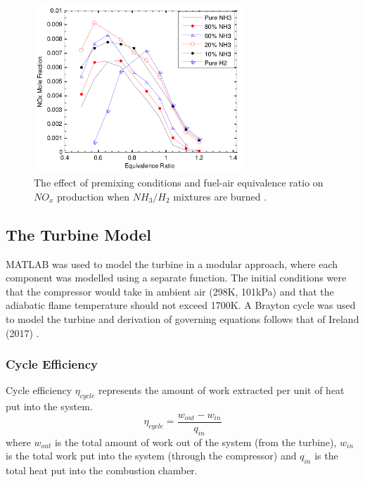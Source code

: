 \begin{figure} [h]
\centering
\includegraphics[width=0.7\textwidth]{./pictures/NOxhighres.png}
  \caption{The effect of premixing conditions and fuel-air equivalence ratio on $NO_x$ production when $NH_3/H_2$ mixtures are burned \cite{Nozari2015}.} \label{fig:NOxemissions}
  \end{figure}
\subsection{The Turbine Model}
MATLAB was used to model the turbine in a modular approach, where each component was modelled using a separate function. The initial conditions were that the compressor would take in ambient air (298K, 101kPa) and that the adiabatic flame temperature should not exceed 1700K. A Brayton cycle was used to model the turbine and derivation of governing equations follows that of Ireland (2017) \cite{thermonotes}.

\subsubsection{Cycle Efficiency}
Cycle efficiency $\eta_{cycle}$ represents the amount of work extracted per unit of heat put into the system.
\begin{equation}
\eta_{cycle} = \frac{w_{out} - w_{in}}{q_{in}}
\end{equation}
where $w_{out}$ is the total amount of work out of the system (from the turbine), $w_{in}$ is the total work put into the system (through the compressor) and $q_{in}$ is the total heat put into the combustion chamber.

